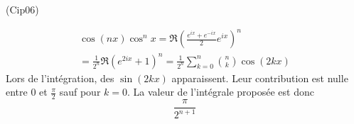 \begin{tiny}(Cip06)\end{tiny}
\begin{multline*}
 \cos(nx)\cos^nx = \Re\left(\frac{e^{ix}+e^{-ix}}{2}e^{ix} \right)^n\\
=\frac{1}{2^n}\Re(e^{2ix}+1)^n 
=\frac{1}{2^n}\sum_{k=0}^n \binom{n}{k}\cos(2kx)
\end{multline*}
Lors de l'intégration, des $\sin(2kx)$ apparaissent. Leur contribution est nulle entre $0$ et $\frac{\pi}{2}$ sauf pour $k=0$. La valeur de l'intégrale proposée est donc
\begin{displaymath}
 \frac{\pi}{2^{n+1}}
\end{displaymath}

